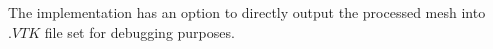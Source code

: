 \noindent
The implementation has an option to directly output the processed mesh into $.VTK$ file set for debugging purposes.

% 
% 
% 
% 
% 		

